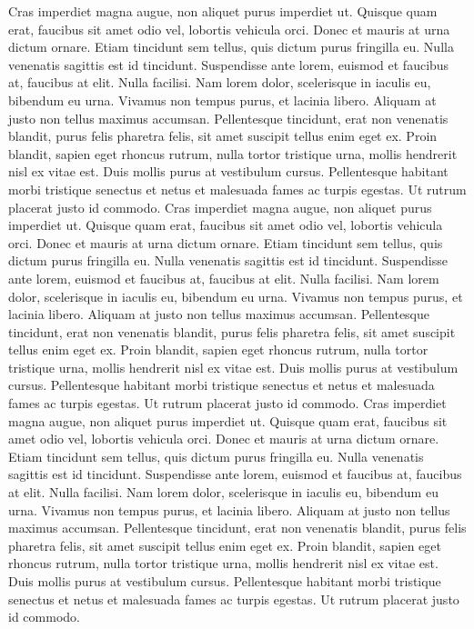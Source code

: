 Cras imperdiet magna augue, non aliquet purus imperdiet ut. Quisque quam erat, faucibus sit amet odio vel, lobortis vehicula orci. Donec et mauris at urna dictum ornare. Etiam tincidunt sem tellus, quis dictum purus fringilla eu. Nulla venenatis sagittis est id tincidunt. Suspendisse ante lorem, euismod et faucibus at, faucibus at elit. Nulla facilisi. Nam lorem dolor, scelerisque in iaculis eu, bibendum eu urna. Vivamus non tempus purus, et\cite{book:vim-ref} lacinia libero. Aliquam at justo non tellus maximus accumsan. Pellentesque tincidunt, erat non venenatis blandit, purus felis pharetra felis, sit amet suscipit tellus enim eget ex. Proin blandit, sapien eget rhoncus rutrum, nulla tortor tristique urna, mollis hendrerit nisl ex vitae est. Duis mollis purus at vestibulum cursus. Pellentesque habitant morbi tristique senectus et netus et malesuada fames ac turpis egestas. Ut rutrum placerat justo id commodo.
Cras imperdiet magna augue, non aliquet purus imperdiet ut. Quisque quam erat, faucibus sit amet odio vel, lobortis vehicula orci. Donec et mauris at urna dictum ornare. Etiam tincidunt sem tellus, quis dictum purus fringilla eu. Nulla venenatis sagittis est id tincidunt. Suspendisse ante lorem, euismod et faucibus at, faucibus at elit. Nulla facilisi. Nam lorem dolor, scelerisque in iaculis eu, bibendum eu urna. Vivamus non tempus purus, et\cite{book:vim-ref} lacinia libero. Aliquam at justo non tellus maximus accumsan. Pellentesque tincidunt, erat non venenatis blandit, purus felis pharetra felis, sit amet suscipit tellus enim eget ex. Proin blandit, sapien eget rhoncus rutrum, nulla tortor tristique urna, mollis hendrerit nisl ex vitae est. Duis mollis purus at vestibulum cursus. Pellentesque habitant morbi tristique senectus et netus et malesuada fames ac turpis egestas. Ut rutrum placerat justo id commodo.
Cras imperdiet magna augue, non aliquet purus imperdiet ut. Quisque quam erat, faucibus sit amet odio vel, lobortis vehicula orci. Donec et mauris at urna dictum ornare. Etiam tincidunt sem tellus, quis dictum purus fringilla eu. Nulla venenatis sagittis est id tincidunt. Suspendisse ante lorem, euismod et faucibus at, faucibus at elit. Nulla facilisi. Nam lorem dolor, scelerisque in iaculis eu, bibendum eu urna. Vivamus non tempus purus, et\cite{book:vim-ref} lacinia libero. Aliquam at justo non tellus maximus accumsan. Pellentesque tincidunt, erat non venenatis blandit, purus felis pharetra felis, sit amet suscipit tellus enim eget ex. Proin blandit, sapien eget rhoncus rutrum, nulla tortor tristique urna, mollis hendrerit nisl ex vitae est. Duis mollis purus at vestibulum cursus. Pellentesque habitant morbi tristique senectus et netus et malesuada fames ac turpis egestas. Ut rutrum placerat justo id commodo.


